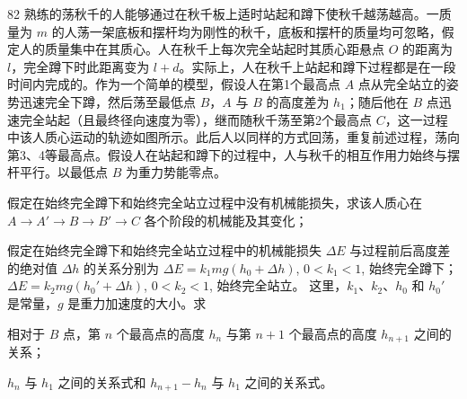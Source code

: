\begin{problem}[第34届物理决赛][荡秋千能量分析]{82}
    熟练的荡秋千的人能够通过在秋千板上适时站起和蹲下使秋千越荡越高。一质量为 $m$ 的人荡一架底板和摆杆均为刚性的秋千，底板和摆杆的质量均可忽略，假定人的质量集中在其质心。人在秋千上每次完全站起时其质心距悬点 $O$ 的距离为 $l$，完全蹲下时此距离变为 $l+d$。实际上，人在秋千上站起和蹲下过程都是在一段时间内完成的。作为一个简单的模型，假设人在第1个最高点 $A$ 点从完全站立的姿势迅速完全下蹲，然后荡至最低点 $B$，$A$ 与 $B$ 的高度差为 $h_{1}$；随后他在 $B$ 点迅速完全站起（且最终径向速度为零），继而随秋千荡至第2个最高点 $C$，这一过程中该人质心运动的轨迹如图所示。此后人以同样的方式回荡，重复前述过程，荡向第3、4等最高点。假设人在站起和蹲下的过程中，人与秋千的相互作用力始终与摆杆平行。以最低点 $B$ 为重力势能零点。
    \begin{subproblem}
        \begin{subsubproblem}
            假定在始终完全蹲下和始终完全站立过程中没有机械能损失，求该人质心在 $A\rightarrow A'\rightarrow B\rightarrow B'\rightarrow C$ 各个阶段的机械能及其变化；
        \end{subsubproblem}
        \begin{subsubproblem}
            假定在始终完全蹲下和始终完全站立过程中的机械能损失 $\Delta E$ 与过程前后高度差的绝对值 $\Delta h$ 的关系分别为
            $\Delta E = k_{1} m g (h_{0} + \Delta h)$, $0<k_{1}<1$, 始终完全蹲下； $\Delta E = k_{2} m g (h_{0}' + \Delta h)$, $0<k_{2}<1$, 始终完全站立。
            这里，$k_{1}$、$k_{2}$、$h_{0}$ 和 $h_{0}'$ 是常量，$g$ 是重力加速度的大小。求
            \begin{subsubsubproblem}
                \begin{subsubsubsubproblem}
                    相对于 $B$ 点，第 $n$ 个最高点的高度 $h_{n}$ 与第 $n+1$ 个最高点的高度 $h_{n+1}$ 之间的关系；
                \end{subsubsubsubproblem}
                \begin{subsubsubsubproblem}
                    $h_{n}$ 与 $h_{1}$ 之间的关系式和 $h_{n+1} - h_{n}$ 与 $h_{1}$ 之间的关系式。
                \end{subsubsubsubproblem}
            \end{subsubsubproblem}
        \end{subsubproblem}
    \end{subproblem}
\end{problem}